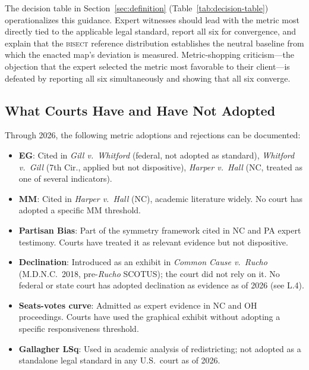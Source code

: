 The decision table in Section~\ref{sec:definition} (Table~\ref{tab:decision-table})
operationalizes this guidance. Expert witnesses should lead with the metric
most directly tied to the applicable legal standard, report all six for
convergence, and explain that the \textsc{bisect} reference distribution
establishes the neutral baseline from which the enacted map's deviation
is measured. Metric-shopping criticism---the objection that the expert selected
the metric most favorable to their client---is defeated by reporting all six
simultaneously and showing that all six converge.

\subsection{What Courts Have and Have Not Adopted}

Through 2026, the following metric adoptions and rejections can be documented:

\begin{itemize}
\item \textbf{EG}: Cited in \textit{Gill v.\ Whitford} (federal, not adopted
  as standard), \textit{Whitford v.\ Gill} (7th Cir., applied but not dispositive),
  \textit{Harper v.\ Hall} (NC, treated as one of several indicators).
\item \textbf{MM}: Cited in \textit{Harper v.\ Hall} (NC), academic literature
  widely. No court has adopted a specific MM threshold.
\item \textbf{Partisan Bias}: Part of the symmetry framework cited in NC and PA
  expert testimony. Courts have treated it as relevant evidence but not dispositive.
\item \textbf{Declination}: Introduced as an exhibit in \textit{Common Cause v.\
  Rucho} (M.D.N.C.\ 2018, pre-\textit{Rucho} SCOTUS); the court did not rely on it.
  No federal or state court has adopted declination as evidence as of 2026 (see L.4).
\item \textbf{Seats-votes curve}: Admitted as expert evidence in NC and OH
  proceedings. Courts have used the graphical exhibit without adopting a specific
  responsiveness threshold.
\item \textbf{Gallagher LSq}: Used in academic analysis of redistricting; not
  adopted as a standalone legal standard in any U.S.\ court as of 2026.
\end{itemize}
